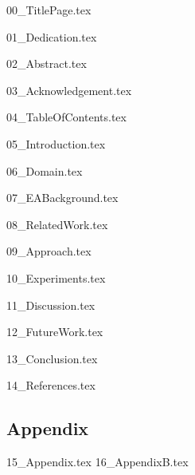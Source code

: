 \documentclass[version=last, pagesize=auto, paper=a4]{report}%
\numberwithin{equation}{section}
\begin{document}
{00_TitlePage.tex}

{01_Dedication.tex}

{02_Abstract.tex}

{03_Acknowledgement.tex}

{04_TableOfContents.tex}

{05_Introduction.tex}

{06_Domain.tex}

{07_EABackground.tex}

{08_RelatedWork.tex}

{09_Approach.tex}

{10_Experiments.tex}

{11_Discussion.tex}

{12_FutureWork.tex}

{13_Conclusion.tex}

{14_References.tex}

\clearpage
\listoffigures

\clearpage
\listoftables

\newpage
\begin{appendices}
    \chapter{Appendix}
        {15_Appendix.tex}
        {16_AppendixB.tex}
\end{appendices}
\end{document}

